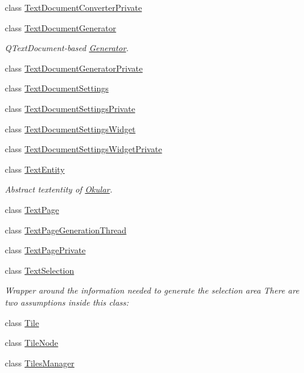 \begin{DoxyCompactItemize}
\item 
class \hyperlink{classOkular_1_1TextDocumentConverterPrivate}{Text\+Document\+Converter\+Private}
\item 
class \hyperlink{classOkular_1_1TextDocumentGenerator}{Text\+Document\+Generator}
\begin{DoxyCompactList}\small\item\em Q\+Text\+Document-\/based \hyperlink{classOkular_1_1Generator}{Generator}. \end{DoxyCompactList}\item 
class \hyperlink{classOkular_1_1TextDocumentGeneratorPrivate}{Text\+Document\+Generator\+Private}
\item 
class \hyperlink{classOkular_1_1TextDocumentSettings}{Text\+Document\+Settings}
\item 
class \hyperlink{classOkular_1_1TextDocumentSettingsPrivate}{Text\+Document\+Settings\+Private}
\item 
class \hyperlink{classOkular_1_1TextDocumentSettingsWidget}{Text\+Document\+Settings\+Widget}
\item 
class \hyperlink{classOkular_1_1TextDocumentSettingsWidgetPrivate}{Text\+Document\+Settings\+Widget\+Private}
\item 
class \hyperlink{classOkular_1_1TextEntity}{Text\+Entity}
\begin{DoxyCompactList}\small\item\em Abstract textentity of \hyperlink{namespaceOkular}{Okular}. \end{DoxyCompactList}\item 
class \hyperlink{classOkular_1_1TextPage}{Text\+Page}
\item 
class \hyperlink{classOkular_1_1TextPageGenerationThread}{Text\+Page\+Generation\+Thread}
\item 
class \hyperlink{classOkular_1_1TextPagePrivate}{Text\+Page\+Private}
\item 
class \hyperlink{classOkular_1_1TextSelection}{Text\+Selection}
\begin{DoxyCompactList}\small\item\em Wrapper around the information needed to generate the selection area There are two assumptions inside this class\+: \end{DoxyCompactList}\item 
class \hyperlink{classOkular_1_1Tile}{Tile}
\item 
class \hyperlink{classOkular_1_1TileNode}{Tile\+Node}
\item 
class \hyperlink{classOkular_1_1TilesManager}{Tiles\+Manager}

\end{DoxyCompactItemize}
